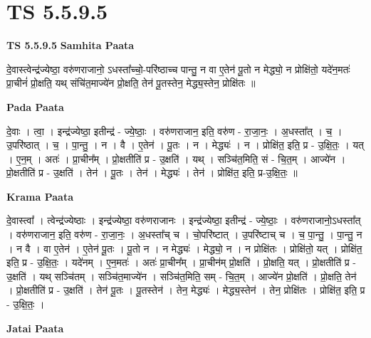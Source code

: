 \documentclass[17pt]{extarticle}
\begin{document}
\section{ TS 5.5.9.5 }

\textbf{TS 5.5.9.5 } \newline
\textbf{Samhita Paata} \newline

दे॒वास्त्वेन्द्र॑ज्येष्ठा॒ वरु॑णराजानो॒ ऽधस्ता᳚च्चो॒-परि॑ष्ठाच्च पान्तु॒ न वा ए॒तेन॑ पू॒तो न मेद्ध्यो॒ न प्रोक्षि॑तो॒ यदे॑न॒मतः॑ प्रा॒चीनं॑ प्रो॒क्षति॒ यथ् संचि॑त॒माज्ये॑न प्रो॒क्षति॒ तेन॑ पू॒तस्तेन॒ मेद्ध्य॒स्तेन॒ प्रोक्षि॑तः ॥ \newline

\textbf{Pada Paata} \newline

दे॒वाः । त्वा॒ । इन्द्र॑ज्येष्ठा॒ इतीन्द्र॑ - ज्ये॒ष्ठाः॒ । वरु॑णराजान॒ इति॒ वरु॑ण - रा॒जा॒नः॒ । अ॒धस्ता᳚त् । च॒ । उ॒परि॑ष्ठात् । च॒ । पा॒न्तु॒ । न । वै । ए॒तेन॑ । पू॒तः । न । मेद्ध्यः॑ । न । प्रोक्षि॑त॒ इति॒ प्र - उ॒क्षि॒तः॒ । यत् । ए॒न॒म् । अतः॑ । प्रा॒चीन᳚म् । प्रो॒क्षतीति॑ प्र - उ॒क्षति॑ । यथ् । सञ्चि॑त॒मिति॒ सं - चि॒त॒म् । आज्ये॑न । प्रो॒क्षतीति॑ प्र - उ॒क्षति॑ । तेन॑ । पू॒तः । तेन॑ । मेद्ध्यः॑ । तेन॑ । प्रोक्षि॑त॒ इति॒ प्र-उ॒क्षि॒तः॒ ॥  \newline


\textbf{Krama Paata} \newline

दे॒वास्त्वा᳚ । त्वेन्द्र॑ज्येष्ठाः । इन्द्र॑ज्येष्ठा॒ वरु॑णराजानः । इन्द्र॑ज्येष्ठा॒ इतीन्द्र॑ - ज्ये॒ष्ठाः॒ । वरु॑णराजानो॒ऽधस्ता᳚त् । वरु॑णराजान॒ इति॒ वरु॑ण - रा॒जा॒नः॒ । अ॒धस्ता᳚च् च । चो॒परि॑ष्टात् । उ॒परि॑ष्टाच् च । च॒ पा॒न्तु॒ । पा॒न्तु॒ न । न वै । वा ए॒तेन॑ । ए॒तेन॑ पू॒तः । पू॒तो न । न मेद्ध्यः॑ । मेद्ध्यो॒ न । न प्रोक्षि॑तः । प्रोक्षि॑तो॒ यत् । प्रोक्षि॑त॒ इति॒ प्र - उ॒क्षि॒तः॒ । यदे॑नम् । ए॒न॒मतः॑ । अतः॑ प्रा॒चीन᳚म् । प्रा॒चीन॑म् प्रो॒क्षति॑ । प्रो॒क्षति॒ यत् । प्रो॒क्षतीति॑ प्र - उ॒क्षति॑ । यथ् सञ्चि॑तम् । सञ्चि॑त॒माज्ये॑न । सञ्चि॑त॒मिति॒ सम् - चि॒त॒म् । आज्ये॑न प्रो॒क्षति॑ । प्रो॒क्षति॒ तेन॑ । प्रो॒क्षतीति॑ प्र - उ॒क्षति॑ । तेन॑ पू॒तः । पू॒तस्तेन॑ । तेन॒ मेद्ध्यः॑ । मेद्ध्य॒स्तेन॑ । तेन॒ प्रोक्षि॑तः । प्रोक्षि॑त॒ इति॒ प्र - उ॒क्षि॒तः॒ । \newline

\textbf{Jatai Paata} \newline
\end{document}
